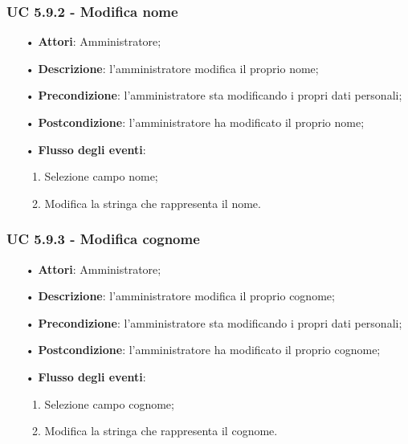 \subsubsection{UC 5.9.2 - Modifica nome}
\begin{itemize}
	\item[•]\textbf{Attori}: Amministratore;
	\item[•]\textbf{Descrizione}: l'amministratore modifica il proprio nome;
	\item[•]\textbf{Precondizione}: l'amministratore sta modificando i propri dati personali;
	\item[•]\textbf{Postcondizione}: l'amministratore ha modificato il proprio nome; 
	\item[•]\textbf{Flusso degli eventi}: 
	\begin{enumerate}
		\item Selezione campo nome;
		\item Modifica la stringa che rappresenta il nome.
	\end{enumerate}
\end{itemize}
\subsubsection{UC 5.9.3 - Modifica cognome}
\begin{itemize}
	\item[•]\textbf{Attori}: Amministratore;
	\item[•]\textbf{Descrizione}: l'amministratore modifica il proprio cognome;
	\item[•]\textbf{Precondizione}: l'amministratore sta modificando i propri dati personali;
	\item[•]\textbf{Postcondizione}: l'amministratore ha modificato il proprio cognome; 
	\item[•]\textbf{Flusso degli eventi}: 
	\begin{enumerate}
		\item Selezione campo cognome;
		\item Modifica la stringa che rappresenta il cognome.
	\end{enumerate}
\end{itemize}
